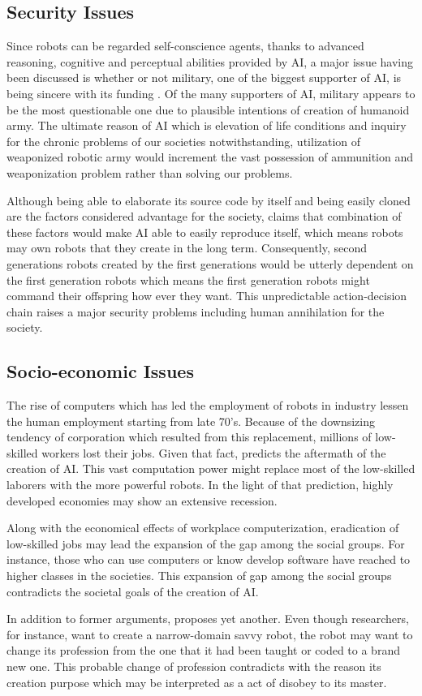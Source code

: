 \documentclass[man]{apa6}
\begin{document}
\subsection{Security Issues}
Since robots can be regarded self-conscience agents, thanks to advanced reasoning, cognitive and perceptual abilities provided by AI, a major issue having been discussed is whether or not military, one of the biggest supporter of AI, is being sincere with its funding \cite{gre}. Of the many supporters of AI, military appears to be the most questionable one due to plausible intentions of creation of humanoid army. The ultimate reason of AI which is elevation of life conditions and inquiry for the chronic problems of our societies notwithstanding, utilization of weaponized robotic army would increment the vast possession of ammunition and weaponization problem rather than solving our problems.\par
Although being able to elaborate its source code by itself and being easily cloned are the factors considered advantage for the society,  claims that combination of these factors would make AI able to easily reproduce itself, which means robots may own robots that they create in the long term. Consequently, second generations robots created by the first generations would be utterly dependent on the first generation robots which means the first generation robots might command their offspring how ever they want. This unpredictable action-decision chain raises a major security problems including human annihilation for the society. 
\subsection{Socio-economic Issues}
The rise of computers which has led the employment of robots in industry lessen the human employment starting from late 70's. Because of the downsizing tendency of corporation which resulted from this replacement, millions of low-skilled workers lost their jobs. Given that fact,  predicts the aftermath of the creation of AI. This vast computation power might replace most of the low-skilled laborers with the more powerful robots. In the light of that prediction, highly developed economies may show an extensive recession.\par
Along with the economical effects of workplace computerization, eradication of low-skilled jobs may lead the expansion of the gap among the social groups. For instance, those who can use computers or know develop software have reached to higher classes in the societies. This expansion of gap among the social groups contradicts the societal goals of the creation of AI.\par
In addition to former arguments,  proposes yet another. Even though researchers, for instance, want to create a narrow-domain savvy robot, the robot may want to change its profession from the one that it had been taught or coded to a brand new one. This probable change of profession contradicts with the reason its creation purpose which may be interpreted as a act of disobey to its master.
\end{document}

